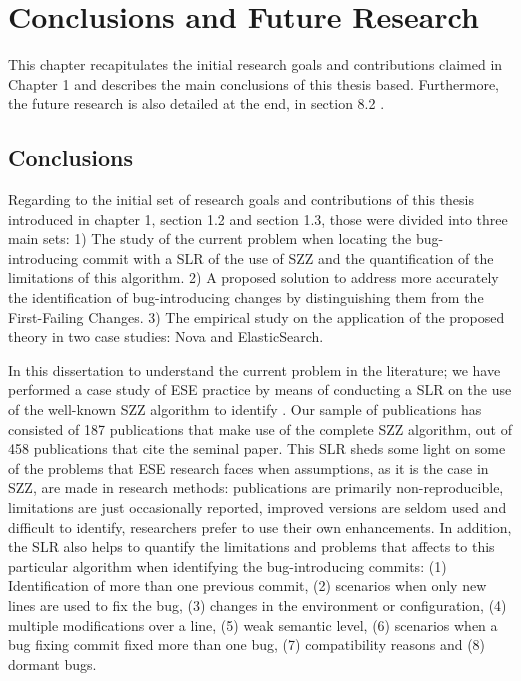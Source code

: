 \documentclass[a4paper, 12pt]{book}
\begin{document}

\cleardoublepage
\chapter{Conclusions and Future Research}
\label{chap:conclusions}

This chapter recapitulates the initial research goals and contributions claimed in Chapter 1 and describes the main conclusions of this thesis based. Furthermore, the future research is also detailed at the end, in section 8.2  .

\section{Conclusions}

Regarding to the initial set of research goals and contributions of this thesis introduced in chapter 1, section 1.2 and section 1.3, those were divided into three main sets: 1) The study of the current problem when locating the bug-introducing commit with a SLR of the use of SZZ and the quantification of the limitations of this algorithm. 2) A proposed solution to address more accurately the identification of bug-introducing changes by distinguishing them from the First-Failing Changes. 3) The empirical study on the application of the proposed theory in two case studies: Nova and ElasticSearch.  

In this dissertation to understand the current problem in the literature;  we have performed a case study of ESE practice by means of conducting a SLR on the use of the well-known SZZ algorithm to identify \BIC. Our sample of publications has consisted of 187 publications that make use of the complete SZZ algorithm, out of 458 publications that cite the seminal paper. This SLR sheds some light on some of the problems that ESE research faces when assumptions, as it is the case in SZZ, are made in research methods: publications are primarily non-reproducible, limitations are just occasionally reported, improved versions are seldom used and difficult to identify, researchers prefer to use their own enhancements. In addition, the SLR also helps to quantify the limitations and problems that affects to this particular algorithm when identifying the bug-introducing commits: (1) Identification of more than one previous commit, (2) scenarios when only new lines are used to fix the bug, (3) changes in the environment or configuration, (4) multiple modifications over a line, (5) weak semantic level, (6) scenarios when a bug fixing commit fixed more than one bug, (7) compatibility reasons and (8) dormant bugs.
\end{document}
